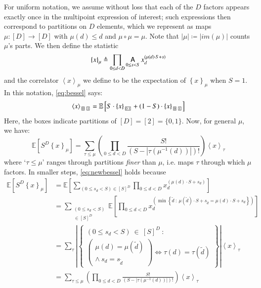 \documentclass[openany, notitlepage, justified]{tufte-book}
\theoremstyle{plain}
\theoremstyle{definition}
\newcommand{\wrap}[1]{\left(#1\right)}
\newcommand{\wasq}[1]{\left[#1\right]}
\newcommand{\wang}[1]{\left\langle#1\right\rangle}
\newcommand{\wabs}[1]{\left|#1\right|}
\newcommand{\wurl}[1]{\left\{#1\right\}}
\newcommand{\partitionbox}[1]{
    \text{
        \fboxsep=0.5pt
        \tiny
        \fbox{#1}
    }
}
\DeclareMathOperator*{\Avg}{\text{\sffamily A}}
\newcommand{\expct}[1]{\mathbb{E}\left[#1\right]}
\begin{document}
        For uniform notation, we assume without loss that each of the $D$
        factors appears exactly once in the multipoint expression of interest;
        such expressions then correspond to partitions on $D$ elements, which
        we represent as maps $\mu:\wasq{D}\to \wasq{D}$ with $\mu(d)\leq d$ and
        $\mu\circ \mu=\mu$.  Note that $\wabs{\mu} \coloneqq \wabs{im(\mu)}$
        counts $\mu$'s parts.  We then define the statistic
        $$
            \wurl{x}_\mu
            \triangleq
            \prod_{0\leq d<D} \Avg_{0\leq s<S} x_d^{(\mu(d)\cdot S + s)}
        $$
        and the correlator $\wang{x}_\mu$ we define to be the expectation of 
        $\wurl{x}_\mu$ when $S=1$.  In this notation, \ref{eq:bessel} says: 
        $$
            \wang{x}_{\partitionbox{0}\partitionbox{1}}
            =
            \expct{
                S       \cdot \wurl{x}_{\partitionbox{0 1}} +
                (1-S)   \cdot \wurl{x}_{\partitionbox{0}\partitionbox{1}}
            }
        $$
        Here, the boxes indicate partitions of $\wasq{D}=\wasq{2}=\{0,1\}$.
        Now, for general $\mu$, we have:
        \begin{equation} \label{eq:newbessel}
            \expct{S^D \wurl{x}_\mu}
            =
            \sum_{\tau\leq \mu} \wrap{
                \prod_{0\leq d<D}
                    \frac{S!}{\wrap{S-\wabs{\tau(\mu^{-1}(d))}}!}
            }
            \wang{x}_\tau
        \end{equation}
        where `$\tau \leq \mu$' ranges through partitions \emph{finer} than 
        $\mu$, i.e. maps $\tau$ through which $\mu$ factors.   
        In smaller steps, \ref{eq:newbessel} holds because
        \begin{align*}
            \expct{S^D \wurl{x}_\mu}
            &=
            \expct{
                \sum_{(0\leq s_d<S) \in \wasq{S}^D}
                \prod_{0\leq d<D}
                x_d^{\wrap{\mu(d)\cdot S + s_d}}
            }\\
            &=
            \sum_{\substack{(0\leq s_d<S) \\ \in \wasq{S}^D}}
            \expct{
                \prod_{0\leq d<D}
                x_d^{\wrap{\min \wurl{
                    \tilde{d}~:~\mu(\tilde{d})\cdot S+s_{\tilde{d}} = \mu(d)\cdot S+s_d
                }}}
            }\\
            &=
            \sum_{\tau} \wabs{\wurl{\substack{
                (0\leq s_d<S)~\in~[S]^D~: \\
                \wrap{\substack{
                    \mu(d)=\mu(\tilde{d}) \\
                    \wedge~s_d=s_{\tilde{d}}
                }}
                \Leftrightarrow
                \tau(d)=\tau(\tilde{d})
            }}}
            \wang{x}_\tau \\
            &=
            \sum_{\tau\leq \mu} \wrap{
                \prod_{0\leq d<D}
                    \frac{S!}{\wrap{S-\wabs{\tau(\mu^{-1}(d))}}!}
            }
            \wang{x}_\tau
        \end{align*}
\end{document}
